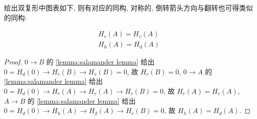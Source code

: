 \begin{corollary}
    给出双复形中图表如下, 则有对应的同构, 对称的, 倒转箭头方向与翻转也可得类似的同构:

    \begin{center}
    \end{center}
    
    \[
        \begin{matrix}
            H_r (A) = H_v (A) \\
            H_h (A) = H_d (A)
        \end{matrix}
    \]

    \begin{proof}
        \(0 \to B\) 的 \ref{lemma:salamander lemma} 给出 \(0 = H_d(0) \to H_r (B) \to H_v (B) = 0\),
        故 \(H_r (B) = 0\), \(0 \to A\) 的 \ref{lemma:salamander lemma} 给出 \(0 = H_d(0) \to H_r (A) \to H_v (A) \to H_r (B) = 0\),
        故 \(H_r (A) = H_v (A)\), \(A \to B\) 的 \ref{lemma:salamander lemma} 给出 \(0 = H_d (0) \to H_h(A) \to H_d (A) \to H_r (B) = 0\),
        故 \(H_h (A) = H_d (A)\).
    \end{proof}
\end{corollary}

